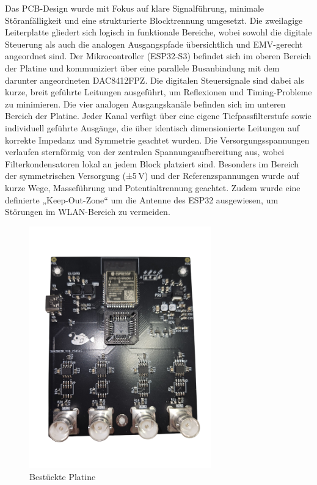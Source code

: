 Das PCB-Design wurde mit Fokus auf klare Signalführung, minimale Störanfälligkeit und eine strukturierte Blocktrennung umgesetzt. Die zweilagige Leiterplatte gliedert sich logisch in funktionale Bereiche, wobei sowohl die digitale Steuerung als auch die analogen Ausgangspfade übersichtlich und EMV-gerecht angeordnet sind.
Der Mikrocontroller (ESP32-S3) befindet sich im oberen Bereich der Platine und kommuniziert über eine parallele Busanbindung mit dem darunter angeordneten DAC8412FPZ. Die digitalen Steuersignale sind dabei als kurze, breit geführte Leitungen ausgeführt, um Reflexionen und Timing-Probleme zu minimieren.
Die vier analogen Ausgangskanäle befinden sich im unteren Bereich der Platine. Jeder Kanal verfügt über eine eigene Tiefpassfilterstufe sowie individuell geführte Ausgänge, die über identisch dimensionierte Leitungen auf korrekte Impedanz und Symmetrie geachtet wurden.
Die Versorgungsspannungen verlaufen sternförmig von der zentralen Spannungsaufbereitung aus, wobei Filterkondensatoren lokal an jedem Block platziert sind. Besonders im Bereich der symmetrischen Versorgung (±5\,V) und der Referenzspannungen wurde auf kurze Wege, Masseführung und Potentialtrennung geachtet.
Zudem wurde eine definierte „Keep-Out-Zone“ um die Antenne des ESP32 ausgewiesen, um Störungen im WLAN-Bereich zu vermeiden.


\begin{figure}[H]
    \centering
    \includegraphics[width=0.7\textwidth]{bilder/Platine_bestueckt.png}
    \caption{Bestückte Platine}
    \label{fig:platine_bestueckt}
\end{figure}
